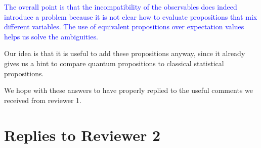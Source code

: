 \documentclass[11pt, executivepaper]{article}
\begin{document}
\begin{enumerate}
\textcolor{blue}{The overall point is that the incompatibility of the observables does indeed introduce a problem because it is not clear how to evaluate propositions that mix different variables. The use of equivalent propositions over expectation values helps us solve the ambiguities.}

Our idea is that it is useful to add these propositions anyway, since it already gives us a hint to compare quantum propositions to classical statistical propositions.
\end{enumerate}

We hope with these answers to have properly replied to the useful comments we received from reviewer 1. 

\section{Replies to Reviewer 2}
\end{document}
